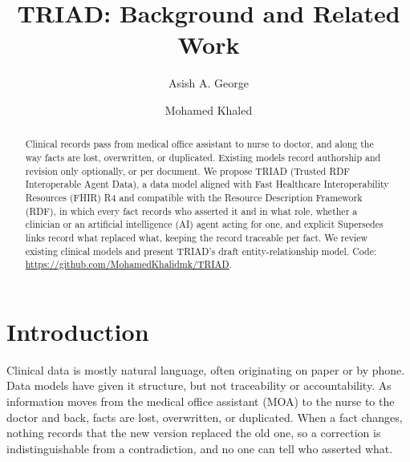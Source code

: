 \documentclass[sigconf]{acmart}
\begin{document}
\title{TRIAD: Background and Related Work}

\author{Asish A. George}

\author{Mohamed Khaled}

\begin{abstract}
\raggedright
Clinical records pass from medical office assistant to nurse to doctor, and along the way facts are lost, overwritten, or duplicated. Existing models record authorship and revision only optionally, or per document. We propose TRIAD (Trusted RDF Interoperable Agent Data), a data model aligned with Fast Healthcare Interoperability Resources (FHIR) R4 and compatible with the Resource Description Framework (RDF), in which every fact records who asserted it and in what role, whether a clinician or an artificial intelligence (AI) agent acting for one, and explicit Supersedes links record what replaced what, keeping the record traceable per fact. We review existing clinical models and present TRIAD's draft entity-relationship model.
Code: \url{https://github.com/MohamedKhalidmk/TRIAD}.
\end{abstract}

\maketitle
\pagestyle{empty}

\section{Introduction}
Clinical data is mostly natural language, often originating on paper or by phone. Data models have given it structure, but not traceability or accountability. As information moves from the medical office assistant (MOA) to the nurse to the doctor and back, facts are lost, overwritten, or duplicated. When a fact changes, nothing records that the new version replaced the old one, so a correction is indistinguishable from a contradiction, and no one can tell who asserted what.
\end{document}
